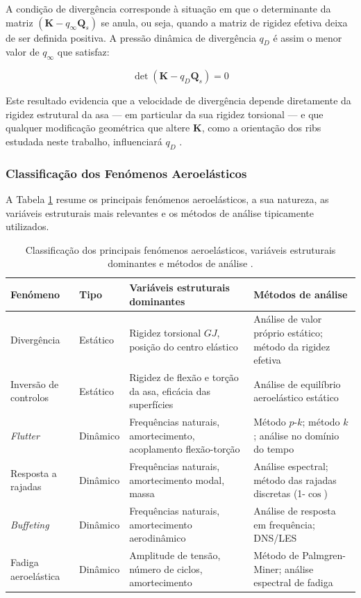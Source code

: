 \documentclass[a4paper,fleqn,noprintline]{cas-dc}
\begin{document}
A condição de divergência corresponde à situação em que o determinante da matriz $\left( \mathbf{K} - q_\infty \mathbf{Q}_s \right)$ se anula, ou seja, quando a matriz de rigidez efetiva deixa de ser definida positiva. A pressão dinâmica de divergência $q_D$ é assim o menor valor de $q_\infty$ que satisfaz:

\begin{equation}
    \det\left( \mathbf{K} - q_D \mathbf{Q}_s \right) = 0
    \label{eq:qD}
\end{equation}

Este resultado evidencia que a velocidade de divergência depende diretamente da rigidez estrutural da asa --- em particular da sua rigidez torsional --- e que qualquer modificação geométrica que altere $\mathbf{K}$, como a orientação dos ribs estudada neste trabalho, influenciará $q_D$ \cite{Bisplinghoff1996}.

\subsubsection{Classificação dos Fenómenos Aeroelásticos}

A Tabela \ref{tab:fenomenos_aero} resume os principais fenómenos aeroelásticos, a sua natureza, as variáveis estruturais mais relevantes e os métodos de análise tipicamente utilizados.

\begin{table}[h!]
\centering
\caption{Classificação dos principais fenómenos aeroelásticos, variáveis 
estruturais dominantes e métodos de análise \cite{Wright2015, Dowell2004}.}
\label{tab:fenomenos_aero}
\renewcommand{\arraystretch}{1.4}
\begin{tabularx}{\textwidth}{p{2.5cm} p{1.8cm} X X}
\toprule
\textbf{Fenómeno} & \textbf{Tipo} & \textbf{Variáveis estruturais dominantes} & \textbf{Métodos de análise} \\
\midrule
Divergência & Estático & 
Rigidez torsional $GJ$, posição do centro elástico & 
Análise de valor próprio estático; método da rigidez efetiva \\
\midrule
Inversão de controlos & Estático & 
Rigidez de flexão e torção da asa, eficácia das superfícies & 
Análise de equilíbrio aeroelástico estático \\
\midrule
\textit{Flutter} & Dinâmico & 
Frequências naturais, amortecimento, acoplamento flexão-torção & 
Método $p$-$k$; método $k$; análise no domínio do tempo \\
\midrule
Resposta a rajadas & Dinâmico & 
Frequências naturais, amortecimento modal, massa & 
Análise espectral; método das rajadas discretas (1-$\cos$) \\
\midrule
\textit{Buffeting} & Dinâmico & 
Frequências naturais, amortecimento aerodinâmico & 
Análise de resposta em frequência; DNS/LES \\
\midrule
Fadiga aeroelástica & Dinâmico & 
Amplitude de tensão, número de ciclos, amortecimento & 
Método de Palmgren-Miner; análise espectral de fadiga \\
\bottomrule
\end{tabularx}
\end{table}
\end{document}
